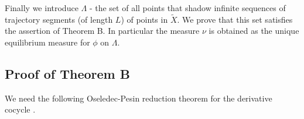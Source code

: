 \documentclass{amsart}
\theoremstyle{plain}
\theoremstyle{definition}
\theoremstyle{remark}
\numberwithin{equation}{section}
\newcommand{\foot}[1]{\marginpar{\tiny\raggedright #1}}
\newcommand{\az}[1]{\foot{AZ: #1}}
\begin{document}
Finally we introduce $\Lambda$ - the set of all points that shadow infinite sequences of trajectory segments (of length $L$) of points in $\tilde{X}$.
We prove that this set satisfies the assertion of Theorem B. In particular the measure $\nu$ is obtained as the unique equilibrium measure for $\phi$ on $\Lambda$. 
 



\subsection{Proof of Theorem B}\label{sec:Kat}
We need the following Oseledec-Pesin reduction theorem for the derivative cocycle  \cite[Theorem 5.6.1 and Theorem 3.5.5]{pesRed}. %
\end{document}

